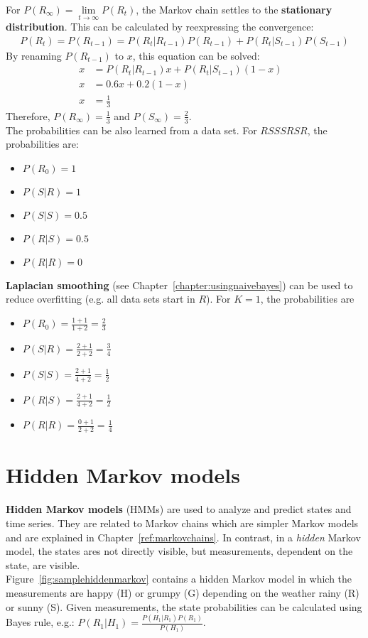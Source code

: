 \documentclass{report}
\begin{document}
For $P(R_\infty)=\lim\limits_{t \rightarrow \infty}P(R_t)$, the Markov chain settles to the {\bf stationary distribution}. This can be calculated by reexpressing the convergence:
\begin{align*}
P(R_t) = P(R_{t-1}) = P(R_t\vert R_{t-1})P(R_{t-1}) + P(R_t\vert S_{t-1})P(S_{t-1})
\end{align*}
By renaming $P(R_{t-1})$ to $x$, this equation can be solved:
\begin{align*}
x &= P(R_t\vert R_{t-1})x + P(R_t\vert S_{t-1})(1-x) &\\
x &= 0.6x + 0.2(1-x) \\
x &= \frac{1}{3}
\end{align*}
Therefore, $P(R_\infty)=\frac{1}{3}$ and $P(S_\infty)=\frac{2}{3}$. \\
The probabilities can be also learned from a data set. For $RSSSRSR$, the probabilities are:
\begin{itemize}
\item $P(R_0)=1$
\item $P(S\vert R)=1$
\item $P(S\vert S)=0.5$
\item $P(R\vert S)=0.5$
\item $P(R\vert R)=0$
\end{itemize}
{\bf Laplacian smoothing} (see Chapter~\ref{chapter:usingnaivebayes}) can be used to reduce overfitting (e.g. all data sets start in $R$). For $K=1$, the probabilities are
\begin{itemize}
\item $P(R_0)=\frac{1+1}{1+2}=\frac{2}{3}$
\item $P(S\vert R)=\frac{2+1}{2+2}=\frac{3}{4}$
\item $P(S\vert S)=\frac{2+1}{4+2}=\frac{1}{2}$
\item $P(R\vert S)=\frac{2+1}{4+2}=\frac{1}{2}$
\item $P(R\vert R)=\frac{0+1}{2+2}=\frac{1}{4}$
\end{itemize}

\section{Hidden Markov models}
\label{section:HMM}
{\bf Hidden Markov models} (HMMs) are used to analyze and predict states and time series. They are related to Markov chains which are simpler Markov models and are explained in Chapter~\ref{ref:markovchains}. In contrast, in a {\em hidden} Markov model, the states ares not directly visible, but measurements, dependent on the state, are visible.
\\
Figure~\ref{fig:samplehiddenmarkov} contains a hidden Markov model in which the measurements are happy (H) or grumpy (G) depending on the weather rainy (R) or sunny (S). Given measurements, the state probabilities can be calculated using Bayes rule, e.g.: $P(R_1\vert H_1)=\frac{P(H_1\vert R_1)P(R_1)}{P(H_1)}$.
\end{document}

